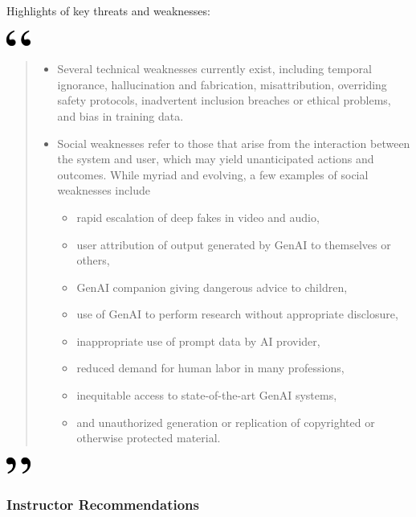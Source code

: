 \documentclass[
]{book}
\begin{document}
Highlights of key threats and weaknesses:

\includegraphics[width=0.3125in,height=0.20833in]{open.png}

\begin{quote}
\begin{itemize}
\item
  Several technical weaknesses currently exist, including temporal ignorance, hallucination and fabrication, misattribution, overriding safety protocols, inadvertent inclusion breaches or ethical problems, and bias in training data.
\item
  Social weaknesses refer to those that arise from the interaction between the system and user, which may yield unanticipated actions and outcomes. While myriad and evolving, a few examples of social weaknesses include

  \begin{itemize}
  \item
    rapid escalation of deep fakes in video and audio,
  \item
    user attribution of output generated by GenAI to themselves or others,
  \item
    GenAI companion giving dangerous advice to children,
  \item
    use of GenAI to perform research without appropriate disclosure,
  \item
    inappropriate use of prompt data by AI provider,
  \item
    reduced demand for human labor in many professions,
  \item
    inequitable access to state-of-the-art GenAI systems,
  \item
    and unauthorized generation or replication of copyrighted or otherwise protected material.
  \end{itemize}
\end{itemize}
\end{quote}

\includegraphics[width=0.3125in,height=0.20833in]{close.png}

\hypertarget{instructor-recommendations}{%
\subsubsection*{Instructor Recommendations}\label{instructor-recommendations}}
\end{document}
